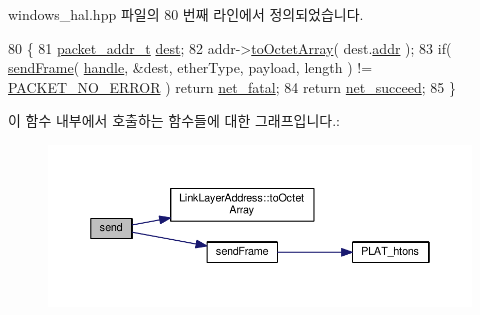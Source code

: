 windows\+\_\+hal.\+hpp 파일의 80 번째 라인에서 정의되었습니다.


\begin{DoxyCode}
80                                                                                                            
                     \{
81         \hyperlink{structpacket__addr__t}{packet\_addr\_t} \hyperlink{namespaceastime__fitline_ab0bede79c5f4cbed9c2cd932a0ace201}{dest};
82         addr->\hyperlink{class_link_layer_address_a1e2896b540d2ea6182d351332737db91}{toOctetArray}( dest.\hyperlink{structpacket__addr__t_ab8af51bba340e97aebc45b9c943fb17c}{addr} );
83         \textcolor{keywordflow}{if}( \hyperlink{packet_8cpp_acd8c9e210db20c3a7ff00f5dfe3076bf}{sendFrame}( \hyperlink{class_windows_p_c_a_p_network_interface_af365a053e5f8823efe7e4ed6a209cd8e}{handle}, &dest, etherType, payload, length ) != 
      \hyperlink{packet_8hpp_ab3fbaeb946a71bfe3ce597df43a5dc27a1d7065f5b2e237a9ae36fafa1557ef31}{PACKET\_NO\_ERROR} ) \textcolor{keywordflow}{return} \hyperlink{avbts__osnet_8hpp_a21b2b4b5e479ef3adfc039ac30c961cda2ab09e0547baba0a6c07a8d53e1529a5}{net\_fatal};
84         \textcolor{keywordflow}{return} \hyperlink{avbts__osnet_8hpp_a21b2b4b5e479ef3adfc039ac30c961cda349eff10b7ad8aef2477575f9306e579}{net\_succeed};
85     \}
\end{DoxyCode}


이 함수 내부에서 호출하는 함수들에 대한 그래프입니다.\+:
\nopagebreak
\begin{figure}[H]
\begin{center}
\leavevmode
\includegraphics[width=350pt]{class_windows_p_c_a_p_network_interface_a1ff75616ab34c1d7df689b5d8ab7a59b_cgraph}
\end{center}
\end{figure}


